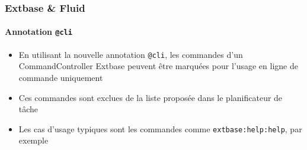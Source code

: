 \begin{frame}[fragile]
	\frametitle{Extbase \& Fluid}
	\framesubtitle{Annotation \texttt{@cli}}

	\begin{itemize}

		\item En utilisant la nouvelle annotation \texttt{@cli}, les commandes d'un
		 	CommandController Extbase peuvent être marquées pour l'usage en ligne de commande
		 	uniquement

		\item Ces commandes sont exclues de la liste proposée dans le planificateur de tâche

		\item Les cas d'usage typiques sont les commandes comme \texttt{extbase:help:help}, par exemple

	\end{itemize}

\end{frame}

